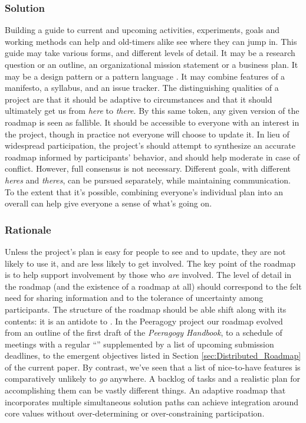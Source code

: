 \subsubsection*{Solution} Building a guide to current and upcoming activities, experiments, goals and working methods can help  and old-timers alike see where they can jump in.  This guide may take various forms, and different levels of detail.  It may be a research question or an outline, an organizational mission statement or a business plan.  It may be a design pattern or a pattern language \cite{kohls2010structure}.  It may combine features of a manifesto, a syllabus, and an issue tracker.  The distinguishing qualities of a project  are that it should be adaptive to circumstances and that it should ultimately get us from \emph{here} to \emph{there}.  By this same token, any given version of the roadmap is seen as fallible.  It should be accessible to everyone with an interest in the project, though in practice not everyone will choose to update it.  In lieu of widespread participation, the project's  should attempt to synthesize an accurate roadmap informed by participants' behavior, and should help moderate in case of conflict.  However, full consensus is not necessary.  Different goals, with different \emph{heres} and \emph{theres}, can be pursued separately, while maintaining communication.  To the extent that it's possible, combining everyone's individual plan into an overall  can help give everyone a sense of what's going on.

\subsubsection*{Rationale} Unless the project's plan is easy for people to see and to update, they are not likely to use it, and are less likely to get involved.  The key point of the roadmap is to help support involvement by those who \emph{are} involved.   The level of detail in the roadmap (and the existence of a roadmap at all) should correspond to the felt need for sharing information and to the tolerance of uncertainty among participants.  
The structure of the roadmap should be able shift along with its contents: it is an antidote to  \cite[pp. 121--124]{david2001software}. 
In the Peeragogy project our roadmap evolved from an outline of the first draft of the
\emph{Peeragogy Handbook}, to a schedule of meetings with a regular
``'' supplemented by a list of upcoming submission deadlines, to the emergent objectives listed in Section \ref{sec:Distributed_Roadmap} of the current paper.
By contrast, we've seen that a list of nice-to-have features is comparatively
unlikely to \emph{go} anywhere.  A backlog of tasks and a realistic
plan for accomplishing them can be vastly different things.
%
An adaptive roadmap that incorporates multiple simultaneous solution paths
can achieve integration around core values without over-determining or
over-constraining participation. 


